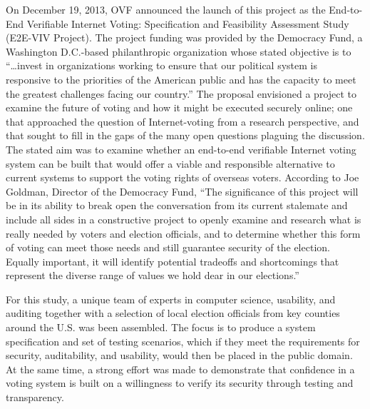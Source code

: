 On December 19, 2013, OVF announced the launch of this project as the
End-to-End Verifiable Internet Voting: Specification and Feasibility
Assessment Study (E2E-VIV Project). The project funding was provided
by the Democracy Fund, a Washington D.C.-based philanthropic
organization whose stated objective is to ``\ldots{}invest in
organizations working to ensure that our political system is
responsive to the priorities of the American public and has the
capacity to meet the greatest challenges facing our country.'' The
proposal envisioned a project to examine the future of voting and how
it might be executed securely online; one that approached the question
of Internet-voting from a research perspective, and that sought to
fill in the gaps of the many open questions plaguing the discussion.
The stated aim was to examine whether an end-to-end verifiable
Internet voting system can be built that would offer a viable and
responsible alternative to current systems to support the voting
rights of overseas voters. According to Joe Goldman, Director of the
Democracy Fund, ``The significance of this project will be in its
ability to break open the conversation from its current stalemate and
include all sides in a constructive project to openly examine and
research what is really needed by voters and election officials, and
to determine whether this form of voting can meet those needs and
still guarantee security of the election. Equally important, it will
identify potential tradeoffs and shortcomings that represent the
diverse range of values we hold dear in our elections.'' 

For this
study, a unique team of experts in computer science, usability, and
auditing together with a selection of local election officials from
key counties around the U.S. was been assembled. The focus is to
produce a system specification and set of testing scenarios, which if
they meet the requirements for security, auditability, and usability,
would then be placed in the public domain. At the same time, a strong
effort was made to demonstrate that confidence in a voting system
is built on a willingness to verify its security through testing and
transparency.

